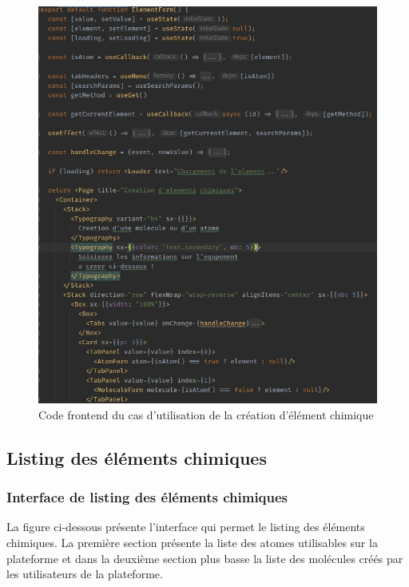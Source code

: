 \begin{figure}[H]
	\centering
	\includegraphics[width=1\textwidth]{img/fec}
	\caption{Code frontend du cas d'utilisation de la création d'élément chimique}
	\label{fig:mesh1}
\end{figure}

\subsection{Listing des éléments chimiques}

\subsubsection{Interface de listing des éléments chimiques}

La figure ci-dessous présente l'interface qui permet le listing des éléments chimiques. 
La première section présente la liste des atomes utilisables sur la plateforme et dans la deuxième section plus basse la liste des molécules créés par les utilisateurs de la plateforme. 

